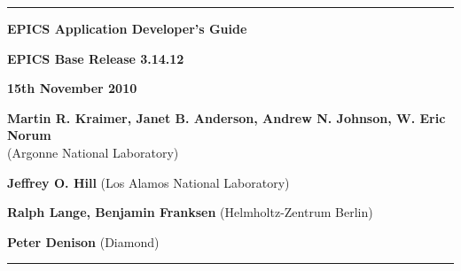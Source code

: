 \hrule

\vspace{1in}

\noindent \Huge \textbf{EPICS Application Developer's Guide}

\vspace{0.5in}

\noindent \Large \textbf{EPICS Base Release 3.14.12}

\noindent \textbf{15th November 2010}

\vspace{0.5in}

\noindent \normalsize \textbf{Martin R. Kraimer, Janet B. Anderson, Andrew N. Johnson, W. Eric Norum}\\
(Argonne National Laboratory)

\noindent \textbf{Jeffrey O. Hill} (Los Alamos National Laboratory)

\noindent \textbf{Ralph Lange, Benjamin Franksen} (Helmholtz-Zentrum Berlin)

\noindent \textbf{Peter Denison} (Diamond)

\vspace{1in}
\hrule
